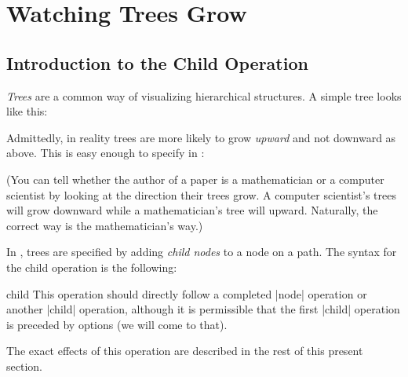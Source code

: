 %


\section{Watching Trees Grow}

\label{section-trees}


\subsection{Introduction to the  Child Operation}

\emph{Trees} are a common way of visualizing hierarchical
structures. A simple tree looks like this:
\begin{codeexample}[]
\end{codeexample}

Admittedly, in reality trees are more likely to grow \emph{upward} and
not downward as above. This is easy enough to specify in \tikzname:

\begin{codeexample}[]
\end{codeexample}

(You can tell whether the author of a paper is a mathematician or a
computer scientist by looking at the direction their trees grow. A
computer scientist's trees will grow downward while a mathematician's
tree will upward. Naturally, the correct way is the mathematician's
way.)

In \tikzname, trees are specified by adding \emph{child nodes} to a
node on a path. The syntax for the child operation is the following:

\begin{pathoperation}{child}{}
  This operation should directly follow a completed |node| operation
  or another |child| operation, although it is permissible that the
  first |child| operation is preceded by options (we will come to
  that).

  The exact effects of this operation are described in the rest of
  this present section.
\end{pathoperation}





